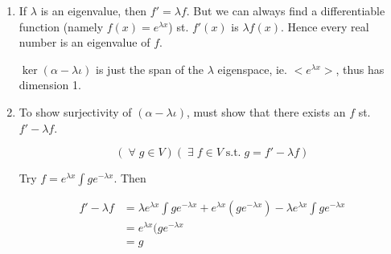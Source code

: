 \documentclass[a4paper]{article}
\begin{document}
\begin{enumerate}
	\item If $ \lambda $ is an eigenvalue, then $ f' = \lambda f $. But we can always find a differentiable function (namely $ f(x) = e^{\lambda x} $) st. $ f'(x) $ is $ \lambda f(x) $. Hence every real number is an eigenvalue of $ f $.

$ \ker(\alpha - \lambda \iota) $ is just the span of the $ \lambda $ eigenspace, ie. $ < e^{\lambda x} > $, thus has dimension 1.


	\item To show surjectivity of $ (\alpha - \lambda \iota) $, must show that there exists an $ f $ st. $ f' - \lambda f $.  
	
	\[ (\; \forall \; g \in V) (\; \exists \; f \in V \; \text{s.t.} \; g = f' - \lambda f) \]
	
	Try $ f = e^{\lambda x} \int g e^{- \lambda x} $. Then
	
	\begin{align*}
	f' - \lambda f & = \lambda e^{\lambda x} \int g e^{- \lambda x} + e^{\lambda x}( g e^{- \lambda x } ) - \lambda e^{\lambda x} \int g e^{- \lambda x}     \\
	& = e^{\lambda x}( g e^{- \lambda x } \\
	& = g
	\end{align*}
	
\end{enumerate}
	
	
	
\end{document}
